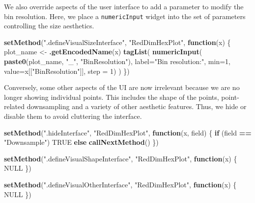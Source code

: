 \documentclass[
]{book}
\newenvironment{Shaded}{\begin{snugshade}}{\end{snugshade}}
\newcommand{\ControlFlowTok}[1]{\textcolor[rgb]{0.13,0.29,0.53}{\textbf{#1}}}
\newcommand{\DataTypeTok}[1]{\textcolor[rgb]{0.13,0.29,0.53}{#1}}
\newcommand{\DecValTok}[1]{\textcolor[rgb]{0.00,0.00,0.81}{#1}}
\newcommand{\KeywordTok}[1]{\textcolor[rgb]{0.13,0.29,0.53}{\textbf{#1}}}
\newcommand{\NormalTok}[1]{#1}
\newcommand{\OperatorTok}[1]{\textcolor[rgb]{0.81,0.36,0.00}{\textbf{#1}}}
\newcommand{\OtherTok}[1]{\textcolor[rgb]{0.56,0.35,0.01}{#1}}
\newcommand{\StringTok}[1]{\textcolor[rgb]{0.31,0.60,0.02}{#1}}
\begin{document}
We also override aspects of the user interface to add a parameter to modify the bin resolution.
Here, we place a \texttt{numericInput} widget into the set of parameters controlling the size aesthetics.

\begin{Shaded}
\begin{Highlighting}[]
\KeywordTok{setMethod}\NormalTok{(}\StringTok{".defineVisualSizeInterface"}\NormalTok{, }\StringTok{"RedDimHexPlot"}\NormalTok{, }\ControlFlowTok{function}\NormalTok{(x) \{}
\NormalTok{    plot_name <-}\StringTok{ }\KeywordTok{.getEncodedName}\NormalTok{(x)}
    \KeywordTok{tagList}\NormalTok{(}
        \KeywordTok{numericInput}\NormalTok{(}
            \KeywordTok{paste0}\NormalTok{(plot_name, }\StringTok{"_"}\NormalTok{, }\StringTok{"BinResolution"}\NormalTok{), }\DataTypeTok{label=}\StringTok{"Bin resolution:"}\NormalTok{,}
            \DataTypeTok{min=}\DecValTok{1}\NormalTok{, }\DataTypeTok{value=}\NormalTok{x[[}\StringTok{"BinResolution"}\NormalTok{]], }\DataTypeTok{step =} \DecValTok{1}\NormalTok{)}
\NormalTok{    )}
\NormalTok{\})}
\end{Highlighting}
\end{Shaded}

Conversely, some other aspects of the UI are now irrelevant because we are no longer showing individual points.
This includes the shape of the points, point-related downsampling and a variety of other aesthetic features.
Thus, we hide or disable them to avoid cluttering the interface.

\begin{Shaded}
\begin{Highlighting}[]
\KeywordTok{setMethod}\NormalTok{(}\StringTok{".hideInterface"}\NormalTok{, }\StringTok{"RedDimHexPlot"}\NormalTok{, }\ControlFlowTok{function}\NormalTok{(x, field) \{}
    \ControlFlowTok{if}\NormalTok{ (field }\OperatorTok{==}\StringTok{ "Downsample"}\NormalTok{) }\OtherTok{TRUE} \ControlFlowTok{else} \KeywordTok{callNextMethod}\NormalTok{()}
\NormalTok{\})}

\KeywordTok{setMethod}\NormalTok{(}\StringTok{".defineVisualShapeInterface"}\NormalTok{, }\StringTok{"RedDimHexPlot"}\NormalTok{, }\ControlFlowTok{function}\NormalTok{(x) \{}
    \OtherTok{NULL}
\NormalTok{\})}

\KeywordTok{setMethod}\NormalTok{(}\StringTok{".defineVisualOtherInterface"}\NormalTok{, }\StringTok{"RedDimHexPlot"}\NormalTok{, }\ControlFlowTok{function}\NormalTok{(x) \{}
    \OtherTok{NULL}
\NormalTok{\})}
\end{Highlighting}
\end{Shaded}
\end{document}
